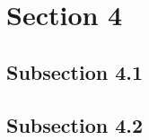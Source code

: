 \section{Section 4}
\label{sec:results}
\subsection{Subsection 4.1}

\subsection{Subsection 4.2}




\FloatBarrier %